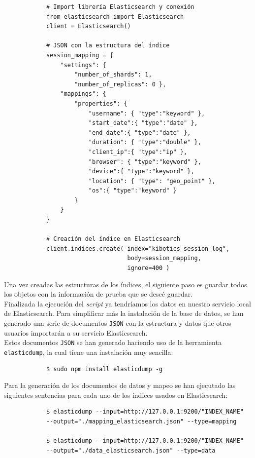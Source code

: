 \documentclass[a4paper, 12pt]{book}
\begin{document}
		{\footnotesize
		\begin{verbatim}
			# Import librería Elasticsearch y conexión
			from elasticsearch import Elasticsearch
			client = Elasticsearch()
			
			# JSON con la estructura del índice
			session_mapping = {
			    "settings": {
			        "number_of_shards": 1,
			        "number_of_replicas": 0 },
			    "mappings": {
			        "properties": {
			            "username": { "type":"keyword" },
			            "start_date":{ "type":"date" },
			            "end_date":{ "type":"date" },
			            "duration": { "type":"double" },
			            "client_ip":{ "type":"ip" },
			            "browser": { "type":"keyword" },
			            "device":{ "type":"keyword" },
			            "location": { "type": "geo_point" },
			            "os":{ "type":"keyword" }
			        }
			    }
			}
			
			# Creación del índice en Elasticsearch
			client.indices.create( index="kibotics_session_log",
			                       body=session_mapping,
			                       ignore=400 )
		\end{verbatim}
		}
	
		Una vez creadas las estructuras de los índices, el siguiente paso es guardar todos los objetos con la información de prueba que se deseé guardar.\\
		
		Finalizada la ejecución del \textit{script} ya tendríamos los datos en nuestro servicio local de Elasticsearch. Para simplificar más la instalación de la base de datos, se han generado una serie de documentos \texttt{JSON} con la estructura y datos que otros usuarios importarán a su servicio Elasticsearch.\\
		
		Estos documentos \texttt{JSON} se han generado haciendo uso de la herramienta \texttt{elasticdump}, la cual tiene una instalación muy sencilla:
		
		{\footnotesize
		\begin{verbatim}
			$ sudo npm install elasticdump -g
		\end{verbatim}
		}
		Para la generación de los documentos de datos y mapeo se han ejecutado las siguientes sentencias para cada uno de los índices usados en Elasticsearch:
		
		{\footnotesize
		\begin{verbatim}
			$ elasticdump --input=http://127.0.0.1:9200/"INDEX_NAME" 
			--output="./mapping_elasticsearch.json" --type=mapping
			
			$ elasticdump --input=http://127.0.0.1:9200/"INDEX_NAME" 
			--output="./data_elasticsearch.json" --type=data
		\end{verbatim}
		}
	
\end{document}

